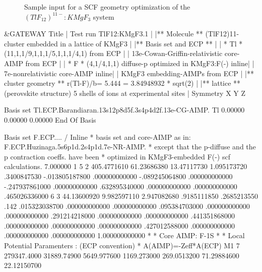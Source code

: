 \begin{figure}[h]
\caption{Sample input for a SCF geometry optimization of the \mbox{$(TlF_{12})^{11-}:KMgF_3$} system}
\label{fig:tlf_input}
\end{figure}
\begin{inputlisting}
 &GATEWAY
Title
|                          Test run TlF12:KMgF3.1                              |
|** Molecule **   (TlF12)11- cluster embedded in a lattice of KMgF3            |
|** Basis set and ECP **                                                       |
|  * Tl * (11,1,1/9,1,1,1/5,1,1,1/4,1)                             from ECP    |
|         13e-Cowan-Griffin-relativistic core-AIMP                 from ECP    |
|  * F *  (4,1/4,1,1) diffuse-p optimized in KMgF3:F(-)                  inline|
|          7e-nonrelativistic core-AIMP                                  inline|
|  KMgF3 embedding-AIMPs                                           from ECP    |
|** cluster geometry **   r(Tl-F)/b= 5.444 = 3.84948932 * sqrt(2)              |
|** lattice **  (perovskite structure) 5 shells of ions at experimental sites  |
Symmetry
X Y Z

Basis set
Tl.ECP.Barandiaran.13s12p8d5f.3s4p4d2f.13e-CG-AIMP. 
Tl     0.00000   0.00000   0.00000
End Of Basis

Basis set
F.ECP.... / Inline 
*    basis set and core-AIMP as in: F.ECP.Huzinaga.5s6p1d.2s4p1d.7e-NR-AIMP.
*    except that the p-diffuse and the p contraction coeffs. have been
*    optimized in KMgF3-embedded F(-) scf calculations.
  7.000000         1
    5    2
   405.4771610
   61.23686380
   13.47117730
   1.095173720
   .3400847530
  -.013805187800   .000000000000
  -.089245064800   .000000000000
  -.247937861000   .000000000000
   .632895340000   .000000000000
   .000000000000   .465026336000
    6    3
   44.13600920
   9.982597110
   2.947082680
   .9185111850
   .2685213550
   .142
   .015323038700   .000000000000   .000000000000
   .095384703000   .000000000000   .000000000000
   .291214218000   .000000000000   .000000000000
   .441351868000   .000000000000   .000000000000
   .000000000000   .427012588000   .000000000000
   .000000000000   .000000000000  1.000000000000
*
* Core AIMP: F-1S
*
* Local Potential Paramenters : (ECP convention)
*                               A(AIMP)=-Zeff*A(ECP)
M1
    7
   279347.4000
   31889.74900
   5649.977600
   1169.273000
   269.0513200
   71.29884600
   22.12150700


\end{inputlisting}
